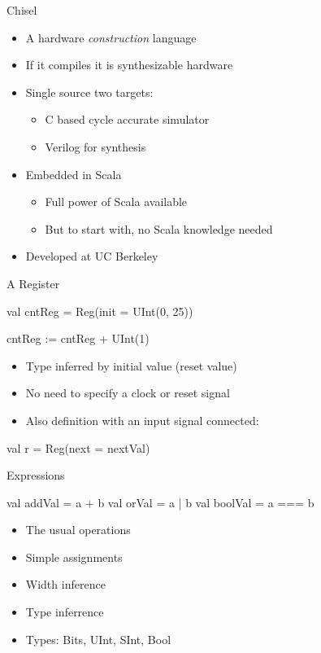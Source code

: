 \documentclass[xcolor=pdflatex,dvipsnames,table]{beamer}
\begin{document}
\begin{frame}[fragile]{Chisel}
\begin{itemize}
\item A hardware \emph{construction} language
\item If it compiles it is synthesizable hardware 
\item Single source two targets:
\begin{itemize}
\item C based cycle accurate simulator
\item Verilog for synthesis
\end{itemize}
\item Embedded in Scala
\begin{itemize}
\item Full power of Scala available
\item But to start with, no Scala knowledge needed
\end{itemize}
\item Developed at UC Berkeley
\end{itemize}
\end{frame}





\begin{frame}[fragile]{A Register}
\begin{chisel}
val cntReg = Reg(init = UInt(0, 25))

cntReg := cntReg + UInt(1)
\end{chisel}
\begin{itemize}
\item Type inferred by initial value (reset value)
\item No need to specify a clock or reset signal
\end{itemize}
\begin{itemize}
\item Also definition with an input signal connected:
\end{itemize}
\begin{chisel}
val r = Reg(next = nextVal) 
\end{chisel}

\end{frame}

\begin{frame}[fragile]{Expressions}
\begin{chisel}
val addVal = a + b
val orVal = a | b
val boolVal = a === b
\end{chisel}
\begin{itemize}
\item The usual operations 
\item Simple assignments
\item Width inference
\item Type inferrence
\item Types: Bits, UInt, SInt, Bool
\end{itemize}
\end{frame}
\end{document}

